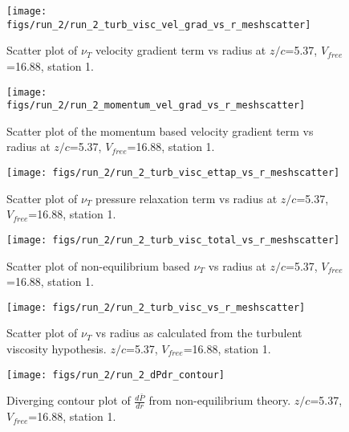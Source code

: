 \begin{figure}[H]
\centering
\texttt{[image: figs/run\_2/run\_2\_turb\_visc\_vel\_grad\_vs\_r\_meshscatter]}
\caption{Scatter plot of $\nu_T$ velocity gradient term vs radius at $z/c$=5.37, $V_{free}$=16.88, station 1.}
\end{figure}


\begin{figure}[H]
\centering
\texttt{[image: figs/run\_2/run\_2\_momentum\_vel\_grad\_vs\_r\_meshscatter]}
\caption{Scatter plot of the momentum based velocity gradient term vs radius at $z/c$=5.37, $V_{free}$=16.88, station 1.}
\end{figure}


\begin{figure}[H]
\centering
\texttt{[image: figs/run\_2/run\_2\_turb\_visc\_ettap\_vs\_r\_meshscatter]}
\caption{Scatter plot of $\nu_T$ pressure relaxation term vs radius at $z/c$=5.37, $V_{free}$=16.88, station 1.}
\end{figure}


\begin{figure}[H]
\centering
\texttt{[image: figs/run\_2/run\_2\_turb\_visc\_total\_vs\_r\_meshscatter]}
\caption{Scatter plot of non-equilibrium based $\nu_T$ vs radius at $z/c$=5.37, $V_{free}$=16.88, station 1.}
\end{figure}


\begin{figure}[H]
\centering
\texttt{[image: figs/run\_2/run\_2\_turb\_visc\_vs\_r\_meshscatter]}
\caption{Scatter plot of $\nu_T$ vs radius as calculated from the turbulent viscosity hypothesis. $z/c$=5.37, $V_{free}$=16.88, station 1.}
\end{figure}


\begin{figure}[H]
\centering
\texttt{[image: figs/run\_2/run\_2\_dPdr\_contour]}
\caption{Diverging contour plot of $\frac{d\bar{P}}{dr}$ from non-equilibrium theory. $z/c$=5.37, $V_{free}$=16.88, station 1.}
\end{figure}


